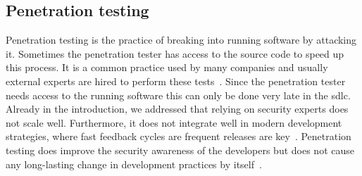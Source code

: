 \subsection{Penetration testing}
Penetration testing is the practice of breaking into running software by attacking it.
Sometimes the penetration tester has access to the source code to speed up this process.
It is a common practice used by many companies and usually external experts are hired to perform these tests~\cite{cruzes2017security}.
Since the penetration tester needs access to the running software this can only be done very late in the \gls{sdlc}.
Already in the introduction, we addressed that relying on security experts does not scale well.
Furthermore, it does not integrate well in modern development strategies, where fast feedback cycles are frequent releases are key~\cite{securitytestingagile}.
Penetration testing does improve the security awareness of the developers but does not cause any long-lasting change in development practices by itself~\cite{turpe2016penetration}.

